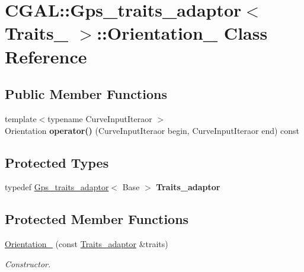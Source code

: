 \hypertarget{class_c_g_a_l_1_1_gps__traits__adaptor_1_1_orientation__2}{}\section{C\+G\+AL\+::Gps\+\_\+traits\+\_\+adaptor$<$ Traits\+\_\+ $>$\+::Orientation\+\_ Class Reference}
\label{class_c_g_a_l_1_1_gps__traits__adaptor_1_1_orientation__2}
\subsection*{Public Member Functions}
\begin{DoxyCompactItemize}
\item 
\mbox{\label{class_c_g_a_l_1_1_gps__traits__adaptor_1_1_orientation__2_af0a042d62e9784c04dddd65db957f64e}} 
{\footnotesize template$<$typename Curve\+Input\+Iteraor $>$ }\\Orientation {\bfseries operator()} (Curve\+Input\+Iteraor begin, Curve\+Input\+Iteraor end) const
\end{DoxyCompactItemize}
\subsection*{Protected Types}
\begin{DoxyCompactItemize}
\item 
\mbox{\label{class_c_g_a_l_1_1_gps__traits__adaptor_1_1_orientation__2_a062da89d8bffc0f3d65e70ac3f9dc7a6}} 
typedef \mbox{\hyperlink{class_c_g_a_l_1_1_gps__traits__adaptor}{Gps\+\_\+traits\+\_\+adaptor}}$<$ Base $>$ {\bfseries Traits\+\_\+adaptor}
\end{DoxyCompactItemize}
\subsection*{Protected Member Functions}
\begin{DoxyCompactItemize}
\item 
\mbox{\hyperlink{class_c_g_a_l_1_1_gps__traits__adaptor_1_1_orientation__2_a53e8983c4f59cbc3db726a1274c0b176}{Orientation\+\_}} (const \mbox{\hyperlink{class_c_g_a_l_1_1_gps__traits__adaptor}{Traits\+\_\+adaptor}} \&traits)
\begin{DoxyCompactList}\small\item\em Constructor. \end{DoxyCompactList}\end{DoxyCompactItemize}
